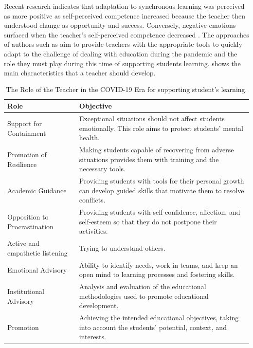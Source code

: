 \documentclass[english]{textolivre}
\begin{document}
Recent research indicates that adaptation to synchronous learning was perceived as more positive as self-perceived competence increased because the teacher then understood change as opportunity and success. Conversely, negative emotions surfaced when the teacher's self-perceived competence decreased \cite[p.~7156]{meishar-tal_times_2021}. The approaches of authors such as \textcite{villafuerte_rol_2020} aim to provide teachers with the appropriate tools to quickly adapt to the challenge of dealing with education during the pandemic and the role they must play during this time of supporting students learning.  shows the main characteristics that a teacher should develop.

\begin{table}[h!]
\centering
\caption{The Role of the Teacher in the COVID-19 Era for supporting student's learning.}
\label{Table01}
\begin{tabular}{p{}p{}}
\toprule
Role & Objective \\
\midrule
Support for Containment & Exceptional situations should not affect students emotionally. This role aims to protect students' mental health. \\
Promotion of Resilience & Making students capable of recovering from adverse situations provides them with training and the necessary tools. \\
Academic Guidance & Providing students with tools for their personal growth can develop guided skills that motivate them to resolve conflicts.\\
Opposition to Procrastination & Providing students with self-confidence, affection, and self-esteem so that they do not postpone their activities. \\
Active and empathetic listening & Trying to understand others. \\
Emotional Advisory & Ability to identify needs, work in teams, and keep an open mind to learning processes and fostering skills.\\
Institutional Advisory & Analysis and evaluation of the educational methodologies used to promote educational development. \\
Promotion & Achieving the intended educational objectives, taking into account the students' potential, context, and interests.\\
\bottomrule
\end{tabular}
\end{table}
\end{document}
